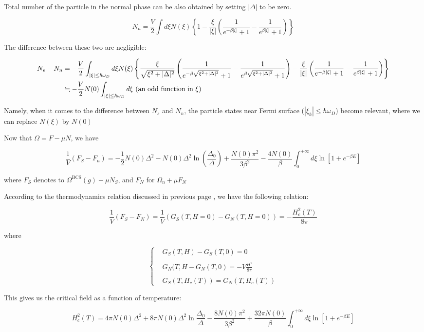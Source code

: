 Total number of the particle in the normal phase can be also obtained by setting $|\Delta|$ to be zero. 

\[N_n = \frac{V}{2}\int d\xi N(\xi)\left\{1-\frac{\xi}{|\xi|}\left(\frac{1}{e^{-\beta|\xi|}+1} - \frac{1}{e^{\beta|\xi|}+1}\right)\right\} \]

The difference between these two are negligible: 

\[\begin{split}
N_s - N_n &= -\frac{V}{2}\int_{|\xi|\le \hbar\omega_D}d\xi N(\xi)\left\{ \frac{\xi}{\sqrt{\xi^2+|\Delta|^2}}\left(\frac{1}{e^{-\beta\sqrt{\xi^2+|\Delta|^2}}+1} - \frac{1}{e^{\beta\sqrt{\xi^2+|\Delta|^2}}+1}\right) - \frac{\xi}{|\xi|}\left(\frac{1}{e^{-\beta|\xi|}+1} - \frac{1}{e^{\beta|\xi|}+1}\right)\right\}\\
&\fallingdotseq-\frac{V}{2}N(0)\int_{|\xi|\le \hbar\omega_D}d\xi\ (\text{an odd function in }\xi)
\end{split}\]

Namely, when it comes to the difference between $N_s$ and $N_n$, the particle states near Fermi surface (${|\xi_k|\le \hbar\omega_D}$) become relevant, where we can replace $N(\xi)$ by $N(0)$

Now that $\Omega = F-\mu N$, we have

\[\frac{1}{V}(F_S-F_n) = -\frac{1}{2}N(0)\Delta^2 - N(0)\Delta^2\ln\left(\frac{\Delta_0}{\Delta}\right) + \frac{N(0)\pi^2}{3\beta^2}-\frac{4N(0)}{\beta}\int_0^{+\infty}d\xi\ln[1+e^{-\beta E}] \]

where $F_S$ denotes to $\Omega^{\text{BCS}}(g)+\mu N_S$, and $F_N$ for $\Omega_n + \mu F_N$

According to the thermodynamics relation discussed in previous page %
, we have the following relation: 

\[\frac{1}{V}(F_S-F_N) = \frac{1}{V}(G_S(T,H=0)-G_N(T,H=0)) = -\frac{H_c^2(T)}{8\pi} \]

where

\[\begin{cases}
&G_S(T,H) - G_S(T,0) = 0\\
& \\
&G_N(T,H - G_N(T,0) = -V\frac{H^2}{8\pi}\\
& \\
&G_S(T,H_c(T)) = G_N(T,H_c(T))
\end{cases}\]

This gives us the critical field as a function of temperature:

\[H_c^2(T) = 4\pi N(0)\Delta^2+8\pi N(0)\Delta^2\ln\frac{\Delta_0}{\Delta} - \frac{8N(0)\pi^2}{3\beta^2}+\frac{32\pi N(0)}{\beta}\int_0^{+\infty}d\xi\ln[1+e^{-\beta E}] \]

